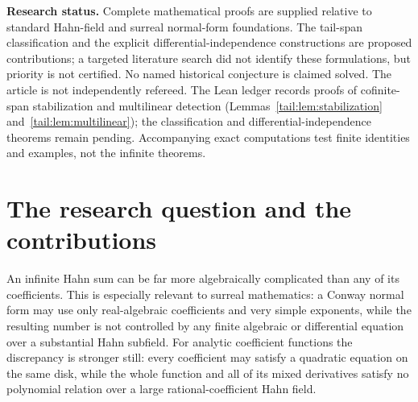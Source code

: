 \documentclass[11pt,a4paper]{article}
\numberwithin{equation}{section}
\theoremstyle{definition}
\theoremstyle{remark}
\newcommand{\C}{\mathbb C}
\newcommand{\Q}{\mathbb Q}
\newcommand{\N}{\mathbb N}
\begin{document}
\begin{titlepage}
\begin{minipage}{.95\textwidth}
\begin{abstract}
For surcomplex analysis, the same mechanism proves that every mixed jet of
$\sum_{n\in A}t^n\sqrt{1-z/2^n}$ is algebraically independent over
$\C(z)((t^{\Q}))$, for every infinite $A\subseteq\N_{>0}$, with respect to
$d/dz$ and $t\,d/dt$. A continuum-sized family enjoys joint mixed-jet
independence on one common disk. We also give exact algebraic-approximation
criteria, finite witnesses, and limitations on coefficient-stream decision
procedures.
\end{abstract}
\end{minipage}
\vfill
\begin{minipage}{.95\textwidth}\small
\textbf{Research status.} Complete mathematical proofs are supplied relative
to standard Hahn-field and surreal normal-form foundations. The tail-span
classification and the explicit differential-independence constructions are
proposed contributions; a targeted literature search did not identify these
formulations, but priority is not certified. No named historical conjecture
is claimed solved. The article is not independently refereed. The Lean
ledger records proofs of cofinite-span stabilization and multilinear
detection (Lemmas~\ref{tail:lem:stabilization} and~\ref{tail:lem:multilinear});
the classification and differential-independence theorems remain pending.
Accompanying exact computations test finite identities and examples,
not the infinite theorems.
\end{minipage}
\end{titlepage}
\hypersetup{pageanchor=true}
\tableofcontents
\clearpage
{}

\section{The research question and the contributions}\label{tail:sec:intro}

An infinite Hahn sum can be far more algebraically complicated than any of
its coefficients. This is especially relevant to surreal mathematics:
a Conway normal form may use only real-algebraic coefficients and very
simple exponents, while the resulting number is not controlled by any
finite algebraic or differential equation over a substantial Hahn subfield.
For analytic coefficient functions the discrepancy is stronger still:
every coefficient may satisfy a quadratic equation on the same disk, while
the whole function and all of its mixed derivatives satisfy no polynomial
relation over a large rational-coefficient Hahn field.
\end{document}
